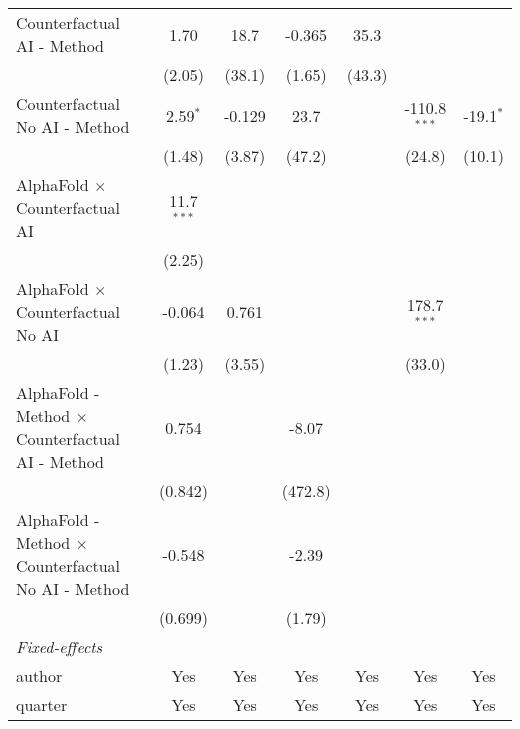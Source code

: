 \begin{tabular}{lcccccc}
   Counterfactual AI - Method                                 & 1.70         & 18.7    & -0.365       & 35.3    &                &   \\   
                                                              & (2.05)       & (38.1)  & (1.65)       & (43.3)  &                &   \\   
   Counterfactual No AI - Method                              & 2.59$^{*}$   & -0.129  & 23.7         &         & -110.8$^{***}$ & -19.1$^{*}$\\   
                                                              & (1.48)       & (3.87)  & (47.2)       &         & (24.8)         & (10.1)\\   
   AlphaFold $\times$ Counterfactual AI                       & 11.7$^{***}$ &         &              &         &                &   \\   
                                                              & (2.25)       &         &              &         &                &   \\   
   AlphaFold $\times$ Counterfactual No AI                    & -0.064       & 0.761   &              &         & 178.7$^{***}$  &   \\   
                                                              & (1.23)       & (3.55)  &              &         & (33.0)         &   \\   
   AlphaFold - Method $\times$ Counterfactual AI - Method     & 0.754        &         & -8.07        &         &                &   \\   
                                                              & (0.842)      &         & (472.8)      &         &                &   \\   
   AlphaFold - Method $\times$ Counterfactual No AI - Method  & -0.548       &         & -2.39        &         &                &   \\   
                                                              & (0.699)      &         & (1.79)       &         &                &   \\   
   \midrule
   \emph{Fixed-effects}\\
   author                                                     & Yes          & Yes     & Yes          & Yes     & Yes            & Yes\\  
   quarter                                                    & Yes          & Yes     & Yes          & Yes     & Yes            & Yes\\  
   \midrule

\end{tabular}

